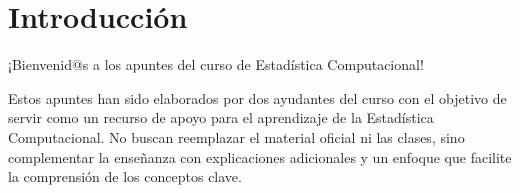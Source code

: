 \section{Introducción}

¡Bienvenid@s a los apuntes del curso de Estadística Computacional!

Estos apuntes han sido elaborados por dos ayudantes del curso con el objetivo
 de servir como un recurso de apoyo para el aprendizaje de la Estadística Computacional.
 No buscan reemplazar el material oficial ni las clases, sino complementar la enseñanza
 con explicaciones adicionales y un enfoque que facilite la comprensión de los conceptos clave.
